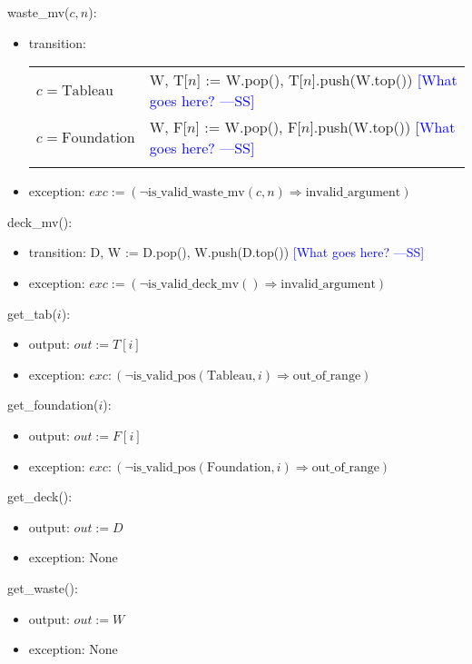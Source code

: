 \documentclass[12pt]{article}
\newcommand{\authornote}[3]{\textcolor{#1}{[#3 ---#2]}}
\newcommand{\authornote}[3]{}
\newcommand{\wss}[1]{\authornote{blue}{SS}{#1}}
\begin{document}
\noindent waste\_mv($c, n$):
\begin{itemize}
\item transition:

\begin{tabular}{|p{3cm}|l|}
\hhline{|-|-|}
$c = \mbox{Tableau}$ & W, T[$n$] :=  W.pop(), T[$n$].push(W.top()) \wss{What goes here?}\\
\hhline{|-|-|}
$c = \mbox{Foundation}$ & W, F[$n$] := W.pop(), F[$n$].push(W.top()) \wss{What goes here?}\\
\hhline{|-|-|}
\end{tabular}

\item exception:
  $exc := (\neg \text{is\_valid\_waste\_mv}(c, n) \Rightarrow
  \text{invalid\_argument})$

\end{itemize}

\noindent deck\_mv():
\begin{itemize}
\item transition: D, W := D.pop(), W.push(D.top()) \wss{What goes here?}
\item exception:
  $exc := (\neg \text{is\_valid\_deck\_mv}() \Rightarrow \text{invalid\_argument})$
\end{itemize}

\noindent get\_tab($i$):
\begin{itemize}
\item output: $out := T[i]$
\item exception: $exc : (\neg \text{is\_valid\_pos}(\text{Tableau}, i) \Rightarrow \text{out\_of\_range})$
\end{itemize}

\noindent get\_foundation($i$):
\begin{itemize}
\item output: $out := F[i]$
\item exception: $exc : (\neg \text{is\_valid\_pos}(\text{Foundation}, i) \Rightarrow \text{out\_of\_range})$
\end{itemize}

\noindent get\_deck():
\begin{itemize}
\item output: $out := D$
\item exception: None
\end{itemize}

\noindent get\_waste():
\begin{itemize}
\item output: $out := W$
\item exception: None
\end{itemize}
\end{document}
